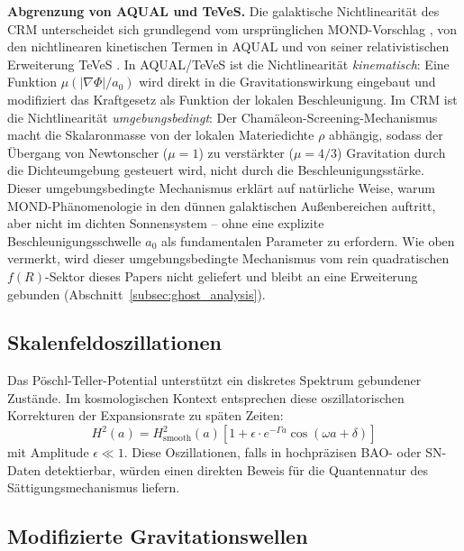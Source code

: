 \documentclass[11pt,a4paper]{article}
\begin{document}
\textbf{Abgrenzung von AQUAL und TeVeS.} Die galaktische Nichtlinearit\"at des CRM unterscheidet sich grundlegend vom urspr\"unglichen MOND-Vorschlag \cite{Milgrom1983}, von den nichtlinearen kinetischen Termen in AQUAL \cite{BekensteinMilgrom1984} und von seiner relativistischen Erweiterung TeVeS \cite{Bekenstein2004}. In AQUAL/TeVeS ist die Nichtlinearit\"at \textit{kinematisch}: Eine Funktion $\mu(|\nabla\Phi|/a_0)$ wird direkt in die Gravitationswirkung eingebaut und modifiziert das Kraftgesetz als Funktion der lokalen Beschleunigung. Im CRM ist die Nichtlinearit\"at \textit{umgebungsbedingt}: Der Cham\"aleon-Screening-Mechanismus macht die Skalaronmasse von der lokalen Materiedichte $\rho$ abh\"angig, sodass der \"Ubergang von Newtonscher ($\mu = 1$) zu verst\"arkter ($\mu = 4/3$) Gravitation durch die Dichteumgebung gesteuert wird, nicht durch die Beschleunigungsst\"arke. Dieser umgebungsbedingte Mechanismus erkl\"art auf nat\"urliche Weise, warum MOND-Ph\"anomenologie in den d\"unnen galaktischen Au\ss{}enbereichen auftritt, aber nicht im dichten Sonnensystem -- ohne eine explizite Beschleunigungsschwelle $a_0$ als fundamentalen Parameter zu erfordern. Wie oben vermerkt, wird dieser umgebungsbedingte Mechanismus vom rein quadratischen $f(R)$-Sektor dieses Papers nicht geliefert und bleibt an eine Erweiterung gebunden (Abschnitt~\ref{subsec:ghost_analysis}).

\subsection{Skalenfeldoszillationen}

Das P\"oschl-Teller-Potential unterst\"utzt ein diskretes Spektrum gebundener Zust\"ande. Im kosmologischen Kontext entsprechen diese oszillatorischen Korrekturen der Expansionsrate zu sp\"aten Zeiten:
\begin{equation}
H^2(a) = H^2_{\mathrm{smooth}}(a) \left[1 + \epsilon \cdot e^{-\Gamma a} \cos(\omega a + \delta)\right]
\end{equation}
mit Amplitude $\epsilon \ll 1$. Diese Oszillationen, falls in hochpr\"azisen BAO- oder SN-Daten detektierbar, w\"urden einen direkten Beweis f\"ur die Quantennatur des S\"attigungsmechanismus liefern.

\subsection{Modifizierte Gravitationswellen}
\end{document}
